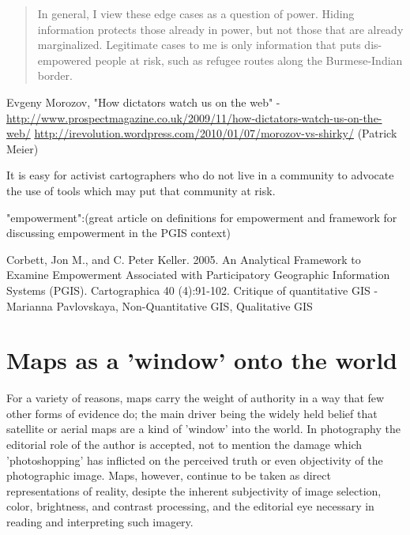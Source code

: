 \documentclass[11pt]{report}
\begin{document}
\begin{quote}
In general, I view these edge cases as a question of power. Hiding information protects those already in power, but not those that are already marginalized. Legitimate cases to me is only information that puts dis-empowered people at risk, such as refugee routes along the Burmese-Indian border.\cite{maron2010freedom}
\end{quote}

Evgeny Morozov, "How dictators watch us on the web" - \url{http://www.prospectmagazine.co.uk/2009/11/how-dictators-watch-us-on-the-web/}
\url{http://irevolution.wordpress.com/2010/01/07/morozov-vs-shirky/} (Patrick Meier)

It is easy for activist cartographers who do not live in a community to advocate the use of tools which may put that community at risk.

"empowerment":(great article on definitions for empowerment and framework for discussing empowerment in the PGIS context)

Corbett, Jon M., and C. Peter Keller. 2005. An Analytical Framework to Examine Empowerment Associated with Participatory Geographic Information Systems (PGIS). Cartographica 40 (4):91-102.
Critique of quantitative GIS - Marianna Pavlovskaya, Non-Quantitative GIS, Qualitative GIS


\section{Maps as a 'window' onto the world}


For a variety of reasons, maps carry the weight of authority in a way that few other forms of evidence do; the main driver being the widely held belief that satellite or aerial maps are a kind of 'window' into the world. In photography the editorial role of the author is accepted, not to mention the damage which 'photoshopping' has inflicted on the perceived truth or even objectivity of the photographic image. Maps, however, continue to be taken as direct representations of reality, desipte the inherent subjectivity of image selection, color, brightness, and contrast processing, and the editorial eye necessary in reading and interpreting such imagery. 
\end{document}
